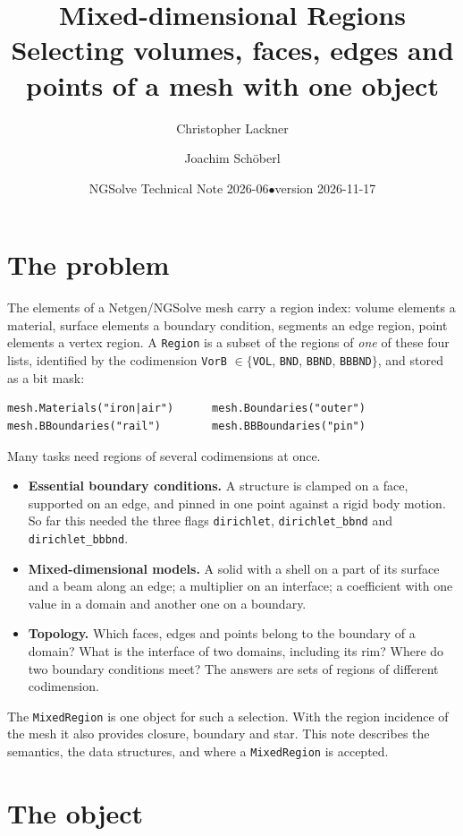 \documentclass[10pt,a4paper]{article}
\title{\vspace{-1.2cm}Mixed-dimensional Regions\\[2pt]
\large Selecting volumes, faces, edges and points of a mesh with one object}
\author{Christopher Lackner \and Joachim Sch\"oberl}
\date{NGSolve Technical Note 2026-06\quad$\bullet$\quad version 2026-11-17}
\newcommand{\code}[1]{\texttt{#1}}
\begin{document}
\maketitle\vspace{-1.2cm}

\section{The problem}

The elements of a Netgen/NGSolve mesh \cite{s97,s14} carry a region index: volume elements a material, surface elements a boundary condition, segments an edge region, point elements a vertex region. A \code{Region} is a subset of the regions of \emph{one} of these four lists, identified by the codimension \code{VorB} $\in\{$\code{VOL}, \code{BND}, \code{BBND}, \code{BBBND}$\}$, and stored as a bit mask:
\begin{lstlisting}[numbers=none,xleftmargin=0pt]
mesh.Materials("iron|air")      mesh.Boundaries("outer")
mesh.BBoundaries("rail")        mesh.BBBoundaries("pin")
\end{lstlisting}
Many tasks need regions of several codimensions at once.
\begin{itemize}\setlength\itemsep{1pt}
\item \textbf{Essential boundary conditions.} A structure is clamped on a face, supported on an edge, and pinned in one point against a rigid body motion. So far this needed the three flags \code{dirichlet}, \code{dirichlet\_bbnd} and \code{dirichlet\_bbbnd}.
\item \textbf{Mixed-dimensional models.} A solid with a shell on a part of its surface and a beam along an edge; a multiplier on an interface; a coefficient with one value in a domain and another one on a boundary.
\item \textbf{Topology.} Which faces, edges and points belong to the boundary of a domain? What is the interface of two domains, including its rim? Where do two boundary conditions meet? The answers are sets of regions of different codimension.
\end{itemize}
The \code{MixedRegion} is one object for such a selection. With the region incidence of the mesh it also provides closure, boundary and star. This note describes the semantics, the data structures, and where a \code{MixedRegion} is accepted.

\section{The object}
\end{document}
